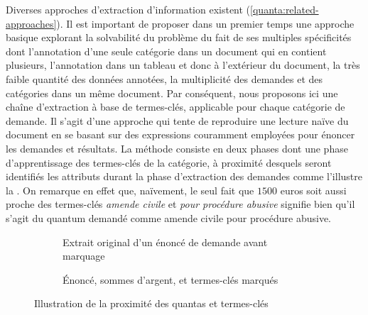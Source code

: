 Diverses approches d'extraction d'information existent (\ref{quanta:related-approaches}). Il est important de proposer dans un premier temps une approche basique explorant la solvabilité du problème du fait de ses multiples spécificités dont l'annotation d'une seule catégorie dans un document qui en contient plusieurs, l'annotation dans un tableau et donc à l'extérieur du document, la très faible quantité des données annotées, la multiplicité des demandes et des catégories dans un même document. Par conséquent, nous proposons ici une chaîne d'extraction à base de termes-clés, applicable pour chaque catégorie de demande. Il s'agit d'une approche qui tente de reproduire une lecture naïve du document en se basant sur des expressions couramment employées pour énoncer les demandes et résultats. La méthode consiste en deux phases dont une phase d'apprentissage des termes-clés de la catégorie, à proximité desquels seront identifiés les attributs durant la phase d'extraction des demandes comme l'illustre la . On remarque en effet que, naïvement, le seul fait que $1500$ euros soit aussi proche des termes-clés \textit{amende civile} et \textit{pour procédure abusive} signifie bien qu'il s'agit du quantum demandé comme amende civile pour procédure abusive.

\begin{figure}[!htb]
	\small
	\centering
	\begin{subfigure}[t]{0.95\textwidth}
		\caption{Extrait original d'un énoncé de demande avant marquage}\label{fig:quanta:exemple-proximite-original}
	\end{subfigure} 
	
	
	\begin{subfigure}[t]{0.95\textwidth}
		\caption{Énoncé, sommes d'argent, et termes-clés marqués}\label{fig:quanta:exemple-proximite-marquage}
	\end{subfigure}
	\caption{Illustration de la proximité des quantas et termes-clés}
	\label{fig:quanta:exemple-proximite}
\end{figure} 

